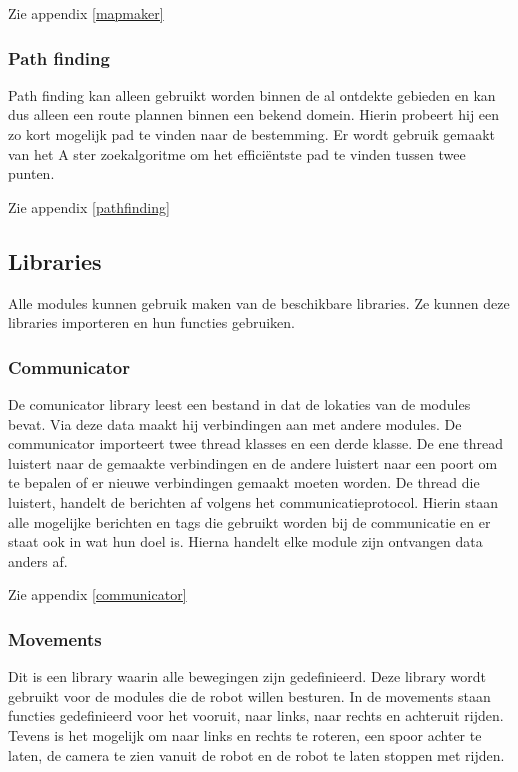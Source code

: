 \documentclass[a4paper,10pt]{article}
\begin{document}
Zie appendix \ref{mapmaker}

\subsubsection{Path finding}
Path finding kan alleen gebruikt worden binnen de al ontdekte gebieden en kan dus alleen een route plannen binnen een bekend domein. Hierin probeert hij een zo kort mogelijk pad te vinden naar de bestemming. Er wordt gebruik gemaakt van het A ster zoekalgoritme om het effici\"{e}ntste pad te vinden tussen twee punten.

Zie appendix \ref{pathfinding}

\subsection{Libraries}
Alle modules kunnen gebruik maken van de beschikbare libraries. Ze kunnen deze libraries importeren en hun functies gebruiken.

\subsubsection{Communicator}
De comunicator library leest een bestand in dat de lokaties van de modules bevat. Via deze data maakt hij verbindingen aan met andere modules. De communicator importeert twee thread klasses en een derde klasse. De ene thread luistert naar de gemaakte verbindingen en de andere luistert naar een poort om te bepalen of er nieuwe verbindingen gemaakt moeten worden. De thread die luistert, handelt de berichten af volgens het communicatieprotocol. Hierin staan alle mogelijke berichten en tags die gebruikt worden bij de communicatie en er staat ook in wat hun doel is. Hierna handelt elke module zijn ontvangen data anders af.

Zie appendix \ref{communicator}

\subsubsection{Movements}
Dit is een library waarin alle bewegingen zijn gedefinieerd. Deze library wordt gebruikt voor de modules die de robot willen besturen. In de movements staan functies gedefinieerd voor het vooruit, naar links, naar rechts en achteruit rijden. Tevens is het mogelijk om naar links en rechts te roteren, een spoor achter te laten, de camera te zien vanuit de robot en de robot te laten stoppen met rijden.
\end{document}
